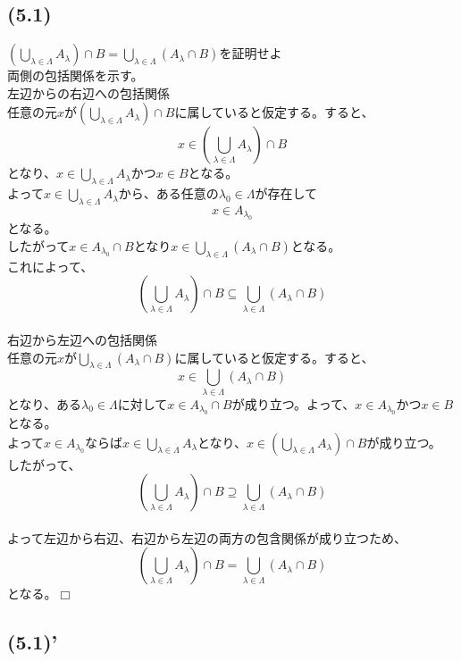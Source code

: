 \documentclass[a4j]{jsarticle}
\def \QED{\hfill $\Box$}%
\begin{document}
\subsection{(5.1)}

$\left( \bigcup_{\lambda \in \Lambda}A_\lambda \right) \cap B = \bigcup_{\lambda \in \Lambda}(A_\lambda \cap B)$を証明せよ\\

両側の包括関係を示す。\\

左辺からの右辺への包括関係\\
任意の元$x$が$\left( \bigcup_{\lambda \in \Lambda}A_\lambda \right) \cap B$に属していると仮定する。すると、$$x \in \left( \bigcup_{\lambda \in \Lambda}A_\lambda \right) \cap B$$となり、$x \in \bigcup_{\lambda \in \Lambda}A_\lambda$かつ$x \in B$となる。\\
よって$x \in \bigcup_{\lambda \in \Lambda}A_\lambda$から、ある任意の$\lambda_0 \in \Lambda$が存在して$$ x \in A_{\lambda_0} $$となる。\\
したがって$x \in A_{\lambda_0} \cap B$となり$x \in \bigcup_{\lambda \in \Lambda}(A_\lambda \cap B)$となる。\\
これによって、$$\left( \bigcup_{\lambda \in \Lambda}A_\lambda \right) \cap B \subseteq \bigcup_{\lambda \in \Lambda}(A_\lambda \cap B)$$\\

右辺から左辺への包括関係\\
任意の元$x$が$\bigcup_{\lambda \in \Lambda}(A_\lambda \cap B)$に属していると仮定する。すると、$$x \in \bigcup_{\lambda \in \Lambda}(A_\lambda \cap B)$$となり、ある$\lambda_0 \in \Lambda$に対して$x \in A_{\lambda_0} \cap B$が成り立つ。よって、$x \in A_{\lambda_0}$かつ$x \in B$となる。\\
よって$x \in A_{\lambda_0}$ならば$x \in \bigcup_{\lambda \in \Lambda}A_\lambda$となり、$x \in \left( \bigcup_{\lambda \in \Lambda}A_\lambda \right) \cap B$が成り立つ。\\
したがって、$$\left( \bigcup_{\lambda \in \Lambda}A_\lambda \right) \cap B \supseteq \bigcup_{\lambda \in \Lambda}(A_\lambda \cap B)$$\\
よって左辺から右辺、右辺から左辺の両方の包含関係が成り立つため、$$\left( \bigcup_{\lambda \in \Lambda}A_\lambda \right) \cap B = \bigcup_{\lambda \in \Lambda}(A_\lambda \cap B)$$となる。\QED

\subsection{(5.1)'}
\end{document}

